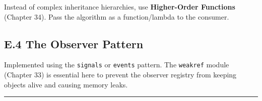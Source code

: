 Instead of complex inheritance hierarchies, use \textbf{Higher-Order
Functions} (Chapter 34). Pass the algorithm as a function/lambda to the
consumer.

\hypertarget{e.4-the-observer-pattern}{%
\subsection{E.4 The Observer Pattern}\label{e.4-the-observer-pattern}}

Implemented using the \passthrough{\lstinline!signals!} or
\passthrough{\lstinline!events!} pattern. The
\passthrough{\lstinline!weakref!} module (Chapter 33) is essential here
to prevent the observer registry from keeping objects alive and causing
memory leaks.

\begin{center}\rule{0.5\linewidth}{0.5pt}\end{center}
